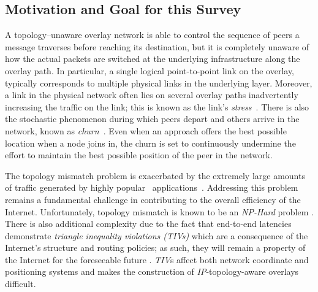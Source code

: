 \subsection{Motivation and Goal for this Survey}
A topology--unaware overlay network is able to control the sequence of peers a
message traverses before reaching its destination, but it is completely unaware
of how the actual packets are switched at the underlying infrastructure along
the overlay path. 
In particular, a single logical point-to-point link on the
overlay, typically corresponds to multiple physical links in the
underlying layer. 
Moreover, a link in the physical network often lies
on several overlay paths inadvertently increasing the traffic on the
link; this is known as the link's \emph{stress}~\cite{CRSZ2002}. 
There is also the stochastic phenomenon during which peers 
depart and others arrive in the network, known 
as \emph{churn}~\cite{stutzbach_churn_2006}.
Even when an approach offers the best possible location
when a node joins in, the churn is set to  
continuously undermine the effort to maintain the best possible position
of the  peer in the network.

The topology mismatch problem is exacerbated by the extremely large amounts of
traffic generated by highly popular \p\ applications~\cite{byl-book}.
Addressing this problem remains a fundamental challenge 
in contributing to the overall efficiency of the Internet. 
Unfortunately, topology mismatch is known to be 
an \emph{NP-Hard} problem \cite{C2000,NPBOOK}. 
There is also additional complexity due to the fact that 
end-to-end latencies demonstrate \emph{triangle inequality
violations (TIVs)} which are a consequence of the Internet's structure and
routing policies; as such, they will remain a property of the Internet 
for the foreseeable future \cite{zheng_irprtt_2005}. 
\emph{TIV}s affect both network coordinate
\cite{cox_vivaldi_2004,wong_meridian_2005} and positioning \cite{ng_gnp_2001}
systems and makes the construction of \emph{IP}-topology-aware 
overlays difficult.


